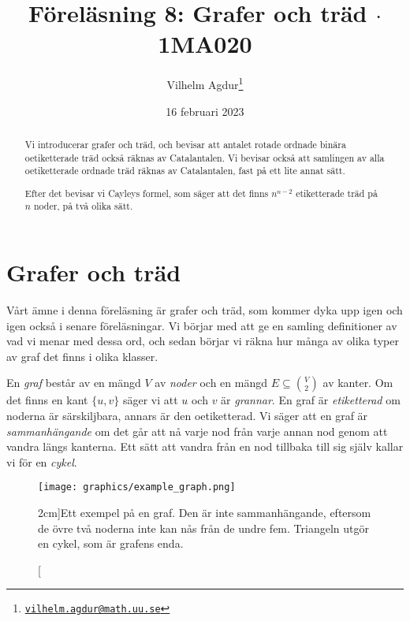 \documentclass[nobib]{tufte-handout}
\title{Föreläsning 8: Grafer och träd $\cdot$ 1MA020}
\author[Vilhelm Agdur]{Vilhelm Agdur\thanks{\href{mailto:vilhelm.agdur@math.uu.se}{\nolinkurl{vilhelm.agdur@math.uu.se}}}}
\date{16 februari 2023}
\begin{document}

\maketitle%

\begin{abstract}
\noindent
Vi introducerar grafer och träd, och bevisar att antalet rotade ordnade binära oetiketterade träd också räknas av Catalantalen. Vi bevisar också att samlingen av alla oetiketterade ordnade träd räknas av Catalantalen, fast på ett lite annat sätt.

Efter det bevisar vi Cayleys formel, som säger att det finns $n^{n-2}$ etiketterade träd på $n$ noder, på två olika sätt.
\end{abstract}

\section{Grafer och träd}

Vårt ämne i denna föreläsning är grafer och träd, som kommer dyka upp igen och igen också i senare föreläsningar. Vi börjar med att ge en samling definitioner av vad vi menar med dessa ord, och sedan börjar vi räkna hur många av olika typer av graf det finns i olika klasser.

\begin{definition}
    En \emph{graf} består av en mängd $V$ av \emph{noder} och en mängd $E \subseteq \binom{V}{2}$ av kanter. Om det finns en kant $\{u,v\}$ säger vi att $u$ och $v$ är \emph{grannar}. En graf är \emph{etiketterad} om noderna är särskiljbara, annars är den oetiketterad. Vi säger att en graf är \emph{sammanhängande} om det går att nå varje nod från varje annan nod genom att vandra längs kanterna. Ett sätt att vandra från en nod tillbaka till sig själv kallar vi för en \emph{cykel}.

    \begin{figure}
        \centering
        \texttt{[image: graphics/example\_graph.png]}
        \caption[][2cm]{Ett exempel på en graf. Den är inte sammanhängande, eftersom de övre två noderna inte kan nås från de undre fem. Triangeln utgör en cykel, som är grafens enda.}
    \end{figure}
\end{definition}
\end{document}
